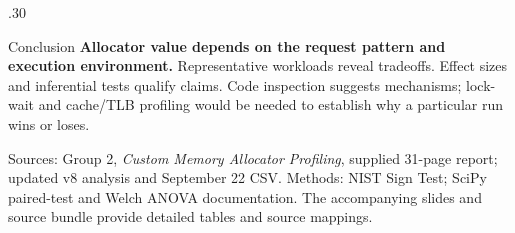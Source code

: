 \documentclass[final]{beamer}
\begin{document}
\begin{frame}[t]
\begin{columns}[t,totalwidth=.96\paperwidth]
\begin{column}{.30\paperwidth}
\vspace{.6cm}
\begin{block}{Conclusion}
\textbf{Allocator value depends on the request pattern and execution environment.} Representative workloads reveal tradeoffs. Effect sizes and inferential tests qualify claims. Code inspection suggests mechanisms; lock-wait and cache/TLB profiling would be needed to establish why a particular run wins or loses.
\end{block}
\vspace{.4cm}
{\footnotesize Sources: Group 2, \emph{Custom Memory Allocator Profiling}, supplied 31-page report; updated v8 analysis and September 22 CSV. Methods: NIST Sign Test; SciPy paired-test and Welch ANOVA documentation. The accompanying slides and source bundle provide detailed tables and source mappings.}
\end{column}
\end{columns}
\end{frame}
\end{document}
